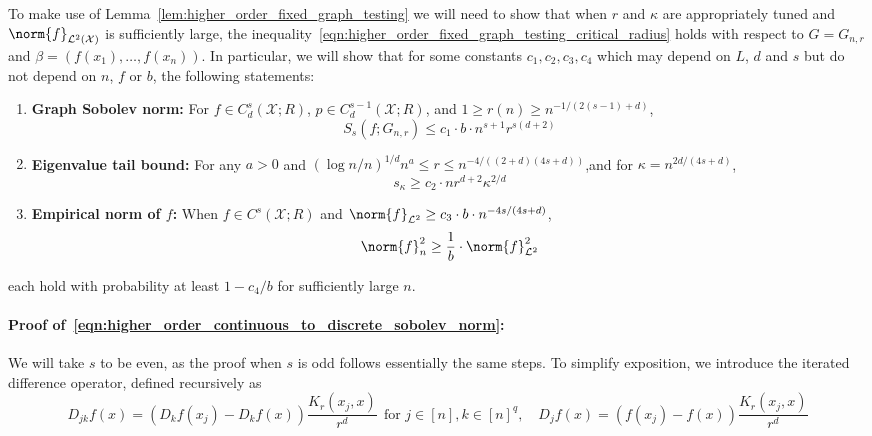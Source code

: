 \documentclass{article}
\newcommand{\1}{\mathbf{1}}
\newcommand{\Xset}{\mathcal{X}}
\newcommand{\Leb}{\mathcal{L}}
\theoremstyle{alden}
\theoremstyle{aldenthm}
\theoremstyle{definition}
\theoremstyle{remark}
\begin{document}
To make use of Lemma~\ref{lem:higher_order_fixed_graph_testing} we will need to show that when $r$ and $\kappa$ are appropriately tuned and $\norm{f}_{\Leb^2(\mathcal{X})}$ is sufficiently large, the inequality~\eqref{eqn:higher_order_fixed_graph_testing_critical_radius} holds with respect to $G = G_{n,r}$ and $\beta = (f(x_1),\ldots,f(x_n))$. In particular, we will show that for some constants $c_1,c_2,c_3,c_4$ which may depend on $L$, $d$ and $s$ but do not depend on $n$, $f$ or $b$, the following statements:
\begin{enumerate}[label=(E\arabic*)]
	\item 
	\label{event:higher_order_discrete_sobolev_norm}
	\textbf{Graph Sobolev norm:} For $f \in C_d^{s}(\mathcal{X};R)$, $p \in C_d^{s - 1}(\Xset;R)$, and $1 \geq r(n) \geq n^{-1/(2(s - 1) + d)}$,
	\begin{equation}
	\label{eqn:higher_order_continuous_to_discrete_sobolev_norm}
	S_s(f;G_{n,r}) \leq c_1 \cdot b \cdot n^{s + 1} r^{s(d + 2)} 
	\end{equation}
	\item 
	\label{event:higher_order_eigenvalue_tail_decay}
	\textbf{Eigenvalue tail bound:} For any $a >0$ and $(\log n/n)^{1/d} n^{a} \leq r \leq n^{-4/((2+d)(4s + d))}$,and for $\kappa = n^{2d/(4s + d)}$, 
	\begin{equation}
	\label{eqn:higher_order_eigenvalue_tail_bound}
	s_{\kappa} \geq c_2 \cdot n r^{d + 2} \kappa^{2/d}
	\end{equation}
	\item 
	\label{event:higher_order_l2_norm}
	\textbf{Empirical norm of $f$:} When $f \in C^{s}(\mathcal{X};R)$ and $\norm{f}_{\Leb^2} \geq c_3 \cdot b \cdot n^{-4s/(4s + d)}$,
	\begin{equation}
	\label{eqn:higher_order_l2_to_empirical_norm}
	\norm{f}_n^2 \geq \frac{1}{b} \cdot \norm{f}_{\Leb^2}^2
	\end{equation}
\end{enumerate} 

each hold with probability at least $1 - c_4/b$ for sufficiently large $n$.

\paragraph{Proof of~\eqref{eqn:higher_order_continuous_to_discrete_sobolev_norm}:}

We will take $s$ to be even, as the proof when $s$ is odd follows essentially the same steps. To simplify exposition, we introduce the iterated difference operator, defined recursively as
\begin{equation*}
D_{jk}f(x) = (D_{k}f(x_j) - D_{k}f(x))\frac{K_r(x_j,x)}{r^d}~~\textrm{for $j \in [n], k \in [n]^q$}, \quad D_jf(x) = (f(x_j) - f(x))\frac{K_r(x_j,x)}{r^d}
\end{equation*}
\end{document}
